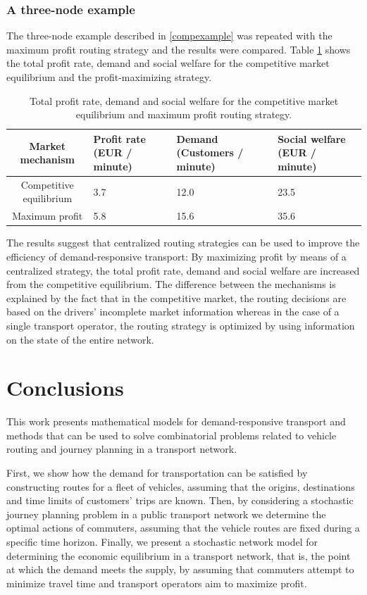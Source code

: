 \documentclass[dissertation,draft*]{aaltoseries}
\begin{document}
\subsection{A three-node example}
The three-node example described in \ref{compexample} was repeated with the maximum profit routing strategy and 
the results were compared. Table \ref{verkkovertailu} shows the total profit rate, demand and social welfare for 
the competitive market equilibrium and the profit-maximizing strategy.

\begin{table}[ht]
\begin{center}
{\footnotesize
\begin{tabular}{|c|p{2.4cm}p{2.4cm}p{2.4cm}|}
\hline
Market mechanism & Profit rate (EUR / minute) & Demand (Customers / minute) & Social welfare (EUR / minute)\\
\hline
Competitive equilibrium & 3.7 & 12.0 & 23.5 \\
Maximum profit & 5.8 & 15.6 & 35.6 \\
\hline 
\end{tabular}
\caption{Total profit rate, demand and social welfare for the competitive market equilibrium and maximum profit routing strategy.}
\label{verkkovertailu}
}
\end{center}
\end{table}

The results suggest that centralized routing strategies can be used to improve the efficiency of demand-responsive transport:
By maximizing profit by means of a centralized strategy, the total profit rate, demand and social welfare are increased from
the competitive equilibrium. The difference between the mechanisms is explained by the fact that in the competitive market, 
the routing decisions are based on the drivers' incomplete market information whereas in the case of a single transport operator,
the routing strategy is optimized by using information on the state of the entire network.



\chapter{Conclusions}
\label{conclusions}
This work presents mathematical models for demand-responsive transport and methods
that can be used to solve combinatorial problems related to vehicle routing and journey planning
in a transport network.

First,
we show how the demand for transportation can be satisfied by constructing routes for a fleet of vehicles,
assuming that the origins, destinations and time limits of customers' trips are known.
Then, by considering a stochastic journey planning problem in a public transport network we determine
the optimal actions of commuters, assuming that the vehicle routes are fixed during a specific time horizon.
Finally, we present a stochastic network model
for determining the economic equilibrium in a transport network, that is, the point at which the demand meets the supply,
by assuming that commuters attempt to minimize travel time and transport operators aim to maximize profit.
\end{document}
